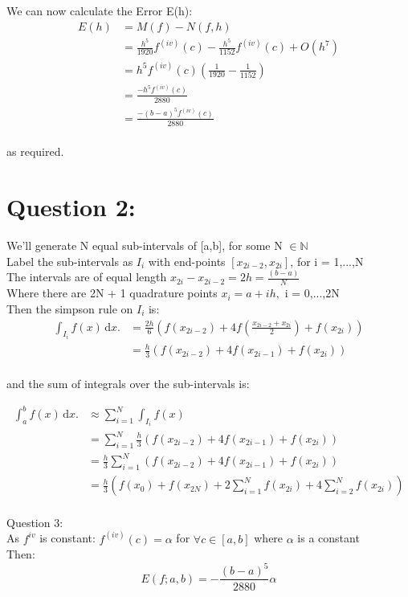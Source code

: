 \documentclass[fleqn]{report}
\begin{document}
We can now calculate the Error E(h):
\begin{equation}
\begin{split}
E(h) & =M(f) - N(f,h)\\
& = \frac{h^5}{1920}f^{(iv)}(c) -  \frac{h^5}{1152}f^{(iv)}(c) + O(h^7) \\
& = h^5f^{(iv)}(c)(\frac{1}{1920} - \frac{1}{1152})\\
& = \frac{-h^5f^{(iv)}(c)}{2880}\\
& = \frac{-(b-a)^5f^{(iv)}(c)}{2880}
\end{split}
\end{equation}
\\
as required.

\section{Question 2:}
We'll generate N equal sub-intervals of [a,b], for some N $\in \mathbb{N}$\\
Label the sub-intervals as $I_{i}$ with end-points $[x_{2i-2}, x_{2i}]$, for i = 1,...,N\\
The intervals are of equal length $x_{2i} - x_{2i-2} = 2h = \frac{(b - a)}{N}$\\
Where there are 2N + 1 quadrature points $x_{i} = a + ih,$ i = 0,...,2N
\\
Then the simpson rule on $I_{i}$ is:
\begin{equation}
\begin{split}
\int_{I_i} \! f(x) \, \mathrm{d}x. & = \frac{2h}{6}
(f(x_{2i-2}) + 4f(\frac{x_{2i-2} + x_{2i}}{2}) + f(x_{2i}))\\
& = \frac{h}{3}(f(x_{2i-2}) + 4f(x_{2i-1}) + f(x_{2i}))
\end{split}
\end{equation}
\\
and the sum of integrals over the sub-intervals is:

\begin{equation}
\begin{split}
\int_a^b \! f(x) \,\mathrm{d}x. & \approx  \sum_{i=1}^{N} \int_{I_i} \! f(x) \,\\
& = \sum_{i=1}^{N} \frac{h}{3}(f(x_{2i-2}) + 4f(x_{2i-1}) + f(x_{2i}))\\
& = \frac{h}{3} \sum_{i=1}^{N} (f(x_{2i-2}) + 4f(x_{2i-1}) + f(x_{2i}))\\
& = \frac{h}{3} (f(x_0) + f(x_{2N}) +  2\sum_{i=1}^{N} f(x_{2i}) + 4\sum_{i=2}^{N} f(x_{2i}))
\end{split}
\end{equation}    
\\
Question 3:\\
As $f^{iv}$ is constant: $f^{(iv)}(c) = \alpha$ for $ \forall c \in [a,b]$ 
where $\alpha$ is a constant\\
Then:
\begin{equation}
E(f;a,b) = -\frac{(b - a)^5}{2880}\alpha
\end{equation}
\end{document}

